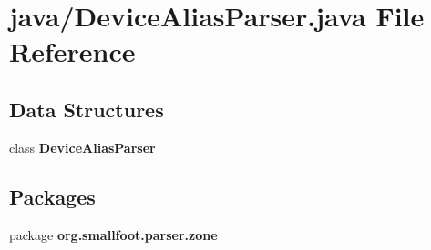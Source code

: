 \section{java/\-Device\-Alias\-Parser.java File Reference}
\label{DeviceAliasParser_8java}
\subsection*{Data Structures}
\begin{DoxyCompactItemize}
\item 
class {\bf Device\-Alias\-Parser}
\end{DoxyCompactItemize}
\subsection*{Packages}
\begin{DoxyCompactItemize}
\item 
package {\bf org.\-smallfoot.\-parser.\-zone}
\end{DoxyCompactItemize}
